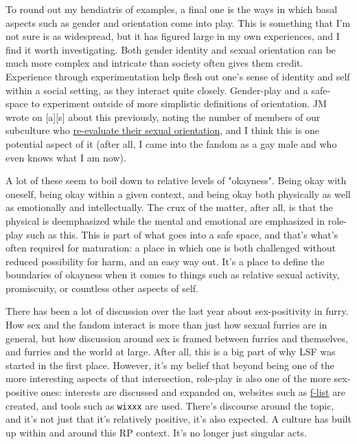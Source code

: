 To round out my hendiatris of examples, a final one is the ways in which basal aspects such as gender and orientation come into play. This is something that I'm not sure is as widespread, but it has figured large in my own experiences, and I find it worth investigating. Both gender identity and sexual orientation can be much more complex and intricate than society often gives them credit. Experience through experimentation help flesh out one's sense of identity and self within a social setting, as they interact quite closely. Gender-play and a safe-space to experiment outside of more simplistic definitions of orientation. JM wrote on {[}a{]}{[}s{]} about this previously, noting the number of members of our subculture who \href{http://adjectivespecies.com/2012/03/19/re-evaluating-your-sexual-preference/}{re-evaluate their sexual orientation}, and I think this is one potential aspect of it (after all, I came into the fandom as a gay male and who even knows what I am now).

A lot of these seem to boil down to relative levels of "okayness". Being okay with oneself, being okay within a given context, and being okay both physically as well as emotionally and intellectually. The crux of the matter, after all, is that the physical is deemphasized while the mental and emotional are emphasized in role-play such as this. This is part of what goes into a safe space, and that's what's often required for maturation: a place in which one is both challenged without reduced possibility for harm, and an easy way out. It's a place to define the boundaries of okayness when it comes to things such as relative sexual activity, promiscuity, or countless other aspects of self.

There has been a lot of discussion over the last year about sex-positivity in furry. How sex and the fandom interact is more than just how sexual furries are in general, but how discussion around sex is framed between furries and themselves, and furries and the world at large. After all, this is a big part of why LSF was started in the first place. However, it's my belief that beyond being one of the more interesting aspects of that intersection, role-play is also one of the more sex-positive ones: interests are discussed and expanded on, websites such as \href{http://f-list.net}{f-list} are created, and tools such as \texttt{wixxx} are used. There's discourse around the topic, and it's not just that it's relatively positive, it's also expected. A culture has built up within and around this RP context. It's no longer just singular acts.
